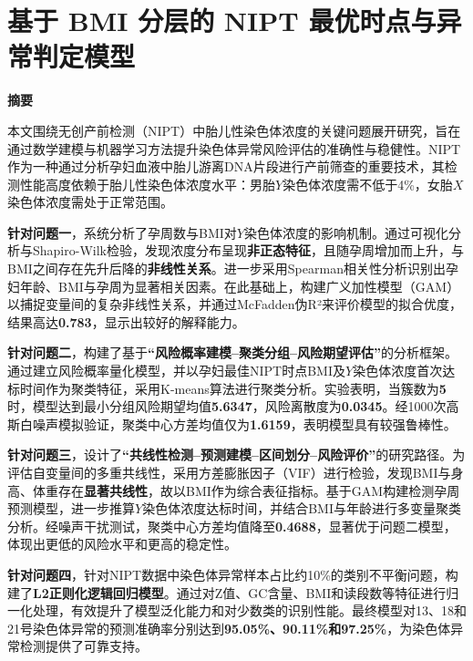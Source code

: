 \documentclass[12pt]{ctexart}
\begin{document}
	\section*{基于 BMI 分层的 NIPT 最优时点与异常判定模型}
	
	\begin{center}
		\Large\textbf{摘要}
	\end{center}
	
	本文围绕无创产前检测（NIPT）中胎儿性染色体浓度的关键问题展开研究，旨在通过数学建模与机器学习方法提升染色体异常风险评估的准确性与稳健性。NIPT作为一种通过分析孕妇血液中胎儿游离DNA片段进行产前筛查的重要技术，其检测性能高度依赖于胎儿性染色体浓度水平：男胎$Y$染色体浓度需不低于4\%，女胎$X$染色体浓度需处于正常范围。
	
	\textbf{针对问题一}，系统分析了孕周数与BMI对$Y$染色体浓度的影响机制。通过可视化分析与Shapiro-Wilk检验，发现浓度分布呈现\textbf{非正态特征}，且随孕周增加而上升，与BMI之间存在先升后降的\textbf{非线性关系}。进一步采用Spearman相关性分析识别出孕妇年龄、BMI与孕周为显著相关因素。在此基础上，构建广义加性模型（GAM）以捕捉变量间的复杂非线性关系，并通过McFadden伪R²来评价模型的拟合优度，结果高达\textbf{0.783}，显示出较好的解释能力。
	
	\textbf{针对问题二}，构建了基于\textbf{“风险概率建模–聚类分组–风险期望评估”}的分析框架。通过建立风险概率量化模型，并以孕妇最佳NIPT时点BMI及$Y$染色体浓度首次达标时间作为聚类特征，采用K-means算法进行聚类分析。实验表明，当簇数为\textbf{5}时，模型达到最小分组风险期望均值\textbf{5.6347}，风险离散度为\textbf{0.0345}。经1000次高斯白噪声模拟验证，聚类中心方差均值仅为\textbf{1.6159}，表明模型具有较强鲁棒性。
	
	\textbf{针对问题三}，设计了\textbf{“共线性检测–预测建模–区间划分–风险评价”}的研究路径。为评估自变量间的多重共线性，采用方差膨胀因子（VIF）进行检验，发现BMI与身高、体重存在\textbf{显著共线性}，故以BMI作为综合表征指标。基于GAM构建检测孕周预测模型，进一步推算$Y$染色体浓度达标时间，并结合BMI与年龄进行多变量聚类分析。经噪声干扰测试，聚类中心方差均值降至\textbf{0.4688}，显著优于问题二模型，体现出更低的风险水平和更高的稳定性。
	
	\textbf{针对问题四}，针对NIPT数据中染色体异常样本占比约10\%的类别不平衡问题，构建了\textbf{L2正则化逻辑回归模型}。通过对Z值、GC含量、BMI和读段数等特征进行归一化处理，有效提升了模型泛化能力和对少数类的识别性能。最终模型对13、18和21号染色体异常的预测准确率分别达到\textbf{95.05\%、90.11\%和97.25\%}，为染色体异常检测提供了可靠支持。
	
	\vspace{8pt}
	
\end{document}
